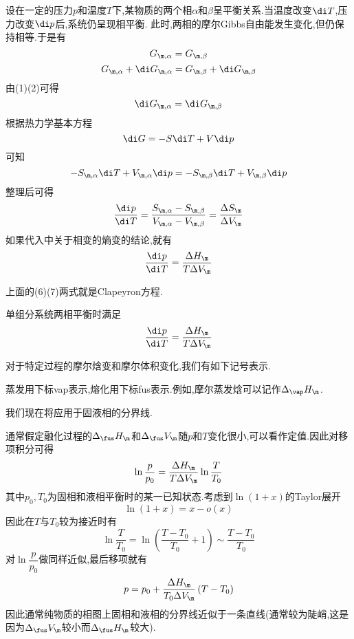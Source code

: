 \documentclass{ctexart}
\begin{document}
\begin{derivation}\setcounter{equation}{0}
    设在一定的压力$p$和温度$T$下,某物质的两个相$\alpha$和$\beta$呈平衡关系.当温度改变$\di T$,压力改变$\di p$后,系统仍呈现相平衡.%
    此时,两相的摩尔Gibbs自由能发生变化,但仍保持相等.于是有
    \begin{equation}G_{\m,\alpha}=G_{\m,\beta}\end{equation}
    \begin{equation}G_{\m,\alpha}+\di G_{\m,\alpha}=G_{\m,\beta}+\di G_{\m,\beta}\end{equation}
    由(1)(2)可得
    \begin{equation}\di G_{\m,\alpha}=\di G_{\m,\beta}\end{equation}
    根据热力学基本方程
    \begin{equation}\di G=-S\di T+V\di p\end{equation}
    可知
    \begin{equation}-S_{\m,\alpha}\di T+V_{\m,\alpha}\di p=-S_{\m,\beta}\di T+V_{\m,\beta}\di p\end{equation}
    整理后可得
    \begin{equation}
        \dfrac{\di p}{\di T}=\dfrac{S_{\m,\alpha}-S_{\m,\beta}}{V_{\m,\alpha}-V_{\m,\beta}}=\dfrac{\Delta S_{\m}}{\Delta V_{\m}}
    \end{equation}
    如果代入中关于相变的熵变的结论,就有
    \begin{equation}
        \dfrac{\di p}{\di T}=\dfrac{\Delta H_{\m}}{T\Delta V_\m}
    \end{equation}

\end{derivation}
上面的(6)(7)两式就是Clapeyron方程.
\begin{theorem}[4A.3.1 Clapeyron方程]
    单组分系统两相平衡时满足
    \[\dfrac{\di p}{\di T}=\dfrac{\Delta H_{\m}}{T\Delta V_\m}\]

\end{theorem}
对于特定过程的摩尔焓变和摩尔体积变化,我们有如下记号表示.
\begin{definition}[4A.3.2 蒸发,熔化的符号表述]
    蒸发用下标vap表示,熔化用下标fus表示.例如,摩尔蒸发焓可以记作$\Delta_\vap H_\m$.
\end{definition}
我们现在将应用于固液相的分界线.
\begin{derivation}
    通常假定融化过程的$\Delta_\fus H_\m$和$\Delta_\fus V_\m$随$p$和$T$变化很小,可以看作定值.因此对移项积分可得
    \[\ln\dfrac{p}{p_0}=\dfrac{\Delta H_{\m}}{T\Delta V_\m}\ln\dfrac{T}{T_0}\]
    其中$p_0,T_0$为固相和液相平衡时的某一已知状态.考虑到$\ln(1+x)$的Taylor展开
    \[\ln(1+x)=x-o(x)\]
    因此在$T$与$T_0$较为接近时有
    \[\ln\dfrac{T}{T_0}=\ln\left(\dfrac{T-T_0}{T_0}+1\right)\sim\dfrac{T-T_0}{T_0}\]
    对$\ln\dfrac{p}{p_0}$做同样近似,最后移项就有
    \[p=p_0+\dfrac{\Delta H_{\m}}{T_0\Delta V_\m}\left(T-T_0\right)\]
    因此通常纯物质的相图上固相和液相的分界线近似于一条直线(通常较为陡峭,这是因为$\Delta_\fus V_\m$较小而$\Delta_\fus H_\m$较大).
\end{derivation}
\end{document}
